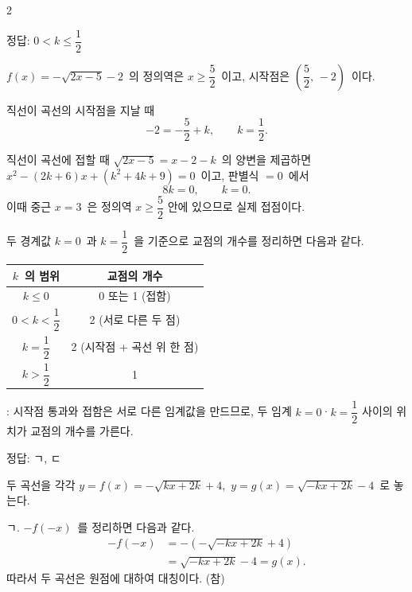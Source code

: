 \documentclass[10pt,fleqn]{article}
\begin{document}
\dmsoltitlefirsttrue
\begin{multicols*}{2}

\begin{dmanswerbox}
정답: $0<k \le \dfrac{1}{2}$
\end{dmanswerbox}

$f(x)=-\sqrt{2x-5}-2$\ 의 정의역은 $x \ge \dfrac{5}{2}$\ 이고, 시작점은 $\left(\dfrac{5}{2},\, -2\right)$\ 이다.

직선이 곡선의 시작점을 지날 때
\[ -2=-\dfrac{5}{2}+k,\qquad k=\dfrac{1}{2}. \]

직선이 곡선에 접할 때 $\sqrt{2x-5}=x-2-k$\ 의 양변을 제곱하면 $x^{2}-(2k+6)x+(k^{2}+4k+9)=0$\ 이고, 판별식 $=0$\ 에서
\[ 8k=0,\qquad k=0. \]
이때 중근 $x=3$\ 은 정의역 $x \ge \dfrac{5}{2}$ 안에 있으므로 실제 접점이다.

두 경계값 $k=0$\ 과 $k=\dfrac{1}{2}$\ 을 기준으로 교점의 개수를 정리하면 다음과 같다.
\begin{center}
\small
\begin{tabular}{c|c}
\hline
$k$\ 의 범위 & 교점의 개수 \\
\hline
$k \le 0$ & 0 또는 1 (접함) \\
$0 < k < \dfrac{1}{2}$ & 2 (서로 다른 두 점) \\
$k = \dfrac{1}{2}$ & 2 (시작점 + 곡선 위 한 점) \\
$k > \dfrac{1}{2}$ & 1 \\
\hline
\end{tabular}
\end{center}

\begin{dmcriticalpoint}
: 시작점 통과와 접함은 서로 다른 임계값을 만드므로, 두 임계 $k=0$·$k=\dfrac{1}{2}$ 사이의 위치가 교점의 개수를 가른다.
\end{dmcriticalpoint}

\begin{dmanswerbox}
정답: ㄱ, ㄷ
\end{dmanswerbox}

두 곡선을 각각 $y = f(x) = -\sqrt{kx + 2k} + 4$,\ $y = g(x) = \sqrt{-kx + 2k} - 4$\ 로 놓는다.

\vspace{3mm}
ㄱ. $-f(-x)$\ 를 정리하면 다음과 같다.
\begin{align*}
  -f(-x) &= -(-\sqrt{-kx + 2k} + 4)\\
         &= \sqrt{-kx + 2k} - 4 = g(x).
\end{align*}
따라서 두 곡선은 원점에 대하여 대칭이다. (참)


\end{multicols*}
\end{document}
